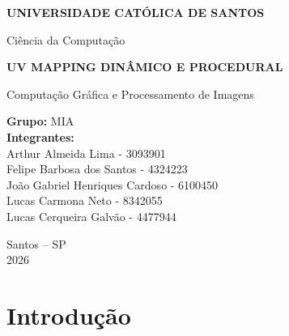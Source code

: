 \documentclass[12pt,a4paper]{report}
\begin{document}
\begin{titlepage}

    \centering

    \vspace*{1.5cm}

    {\Large \textbf{UNIVERSIDADE CATÓLICA DE SANTOS}\par}

    \vspace{0.5cm}

    {\large Ciência da Computação\par}

    \vspace{2.5cm}

    {\LARGE \textbf{UV MAPPING DINÂMICO E PROCEDURAL}\par}

    \vspace{1.5cm}

    {\large Computação Gráfica e Processamento de Imagens\par}

    \vfill

    \begin{flushleft}

    \textbf{Grupo:} MIA\\[0.4cm]

    \textbf{Integrantes:}\\[0.2cm]

    Arthur Almeida Lima - 3093901\\
    Felipe Barbosa dos Santos - 4324223\\
    João Gabriel Henriques Cardoso - 6100450\\
    Lucas Carmona Neto - 8342055\\
    Lucas Cerqueira Galvão - 4477944\\

    \end{flushleft}

    \vfill

    {\large
    Santos -- SP\\
    2026
    \par}

\end{titlepage}

\tableofcontents

\clearpage


\chapter{Introdução}
\label{chap:introducao}

\end{document}

